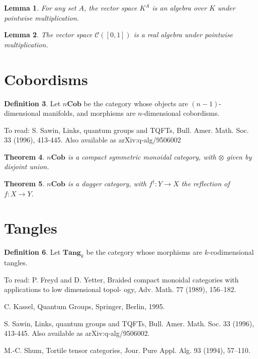 \documentclass{book}
\newtheorem{lm}{Lemma}[chapter]
\newtheorem{thm}[lm]{Theorem}
\theoremstyle{definition}
\newtheorem{df}[lm]{Definition}
\begin{document}
\begin{lm}
For any set $A$, the vector space $K^A$ is an algebra over $K$ under pointwise 
multiplication.
\end{lm}

\begin{lm}
  The vector space $\mathcal{C}([0,1])$ is a real algebra under pointwise 
multiplication.
\end{lm}

\section{Cobordisms}

\begin{df}
Let $n\mathbf{Cob}$ be the category whose objects are 
$(n-1)$-dimensional manifolds, and morphisms are $n$-dimensional cobordisms.
\end{df}

To read: S. Sawin, Links, quantum groups and TQFTs, Bull. Amer. Math. Soc. 33 
(1996), 413-445. Also available
as arXiv:q-alg/9506002

\begin{thm}
$n\mathbf{Cob}$ is a compact symmetric monoidal category, with $\otimes$ given 
by 
disjoint union.
\end{thm}

\begin{thm}
$n\mathbf{Cob}$ is a dagger category, with $f^\dagger : Y \rightarrow X$ the 
reflection of $f : X \rightarrow Y$.
\end{thm}

\section{Tangles}

\begin{df}
Let $\mathbf{Tang}_k$ be the category whose morphisms are $k$-codimensional 
tangles.
\end{df}

To read:
P. Freyd and D. Yetter, Braided compact monoidal categories with applications 
to 
low dimensional topol-
ogy, Adv. Math. 77 (1989), 156–182.

C. Kassel, Quantum Groups, Springer, Berlin, 1995.

S. Sawin, Links, quantum groups and TQFTs, Bull. Amer. Math. Soc. 33 (1996), 
413-445. Also available
as arXiv:q-alg/9506002.

M.-C. Shum, Tortile tensor categories, Jour. Pure Appl. Alg. 93 (1994), 57–110.
\end{document}
